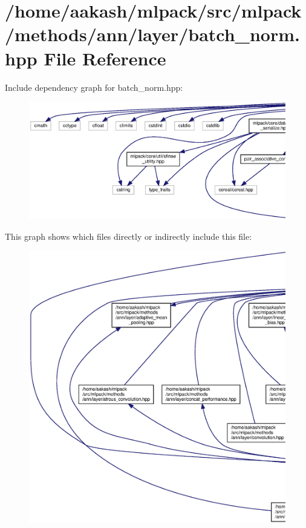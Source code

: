 \section{/home/aakash/mlpack/src/mlpack/methods/ann/layer/batch\+\_\+norm.hpp File Reference}
\label{batch__norm_8hpp}
Include dependency graph for batch\+\_\+norm.\+hpp\+:
\nopagebreak
\begin{figure}[H]
\begin{center}
\leavevmode
\includegraphics[width=350pt]{batch__norm_8hpp__incl}
\end{center}
\end{figure}
This graph shows which files directly or indirectly include this file\+:
\nopagebreak
\begin{figure}[H]
\begin{center}
\leavevmode
\includegraphics[width=350pt]{batch__norm_8hpp__dep__incl}
\end{center}
\end{figure}
